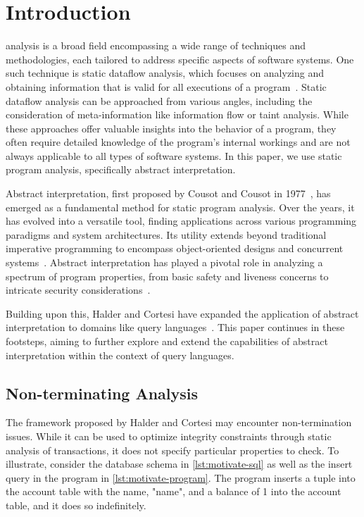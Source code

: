 \section{Introduction}\label{sec:introduction}
 analysis is a broad field encompassing a wide range of techniques and methodologies, each tailored to address specific aspects of software systems.
One such technique is static dataflow analysis, which focuses on analyzing and obtaining information that is valid for all executions of a program~\cite{jackson_software_2000}.
Static dataflow analysis can be approached from various angles, including the consideration of meta-information like information flow or taint analysis.
While these approaches offer valuable insights into the behavior of a program, they often require detailed knowledge of the program's internal workings and are not always applicable to all types of software systems.
In this paper, we use static program analysis, specifically abstract interpretation.

Abstract interpretation, first proposed by Cousot and Cousot in 1977~\cite{cousot_abstract_1977}, has emerged as a fundamental method for static program analysis.
Over the years, it has evolved into a versatile tool, finding applications across various programming paradigms and system architectures.
Its utility extends beyond traditional imperative programming to encompass object-oriented designs and concurrent systems~\cite{gustafsson_analyzing_2013, mine_static_2023}.
Abstract interpretation has played a pivotal role in analyzing a spectrum of program properties, from basic safety and liveness concerns to intricate security considerations~\cite{mastroeni_abstract_2011}.

Building upon this, Halder and Cortesi have expanded the application of abstract interpretation to domains like query languages~\cite{halder_abstract_2012}.
This paper continues in these footsteps, aiming to further explore and extend the capabilities of abstract interpretation within the context of query languages.


\subsection{Non-terminating Analysis}\label{subsec:non-terminating-analysis}
The framework proposed by Halder and Cortesi may encounter non-termination issues.
While it can be used to optimize integrity constraints through static analysis of transactions, it does not specify particular properties to check.
To illustrate, consider the database schema in \autoref{lst:motivate-sql} as well as the insert query in the program in \autoref{lst:motivate-program}.
The program inserts a tuple into the account table with the name, "name", and a balance of 1 into the account table, and it does so indefinitely.



